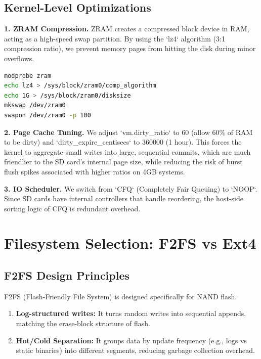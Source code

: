\documentclass[conference]{IEEEtran}
\begin{document}
\subsection{Kernel-Level Optimizations}

\textbf{1. ZRAM Compression.} ZRAM creates a compressed block device in RAM, acting as a high-speed swap partition. By using the `lz4` algorithm (3:1 compression ratio), we prevent memory pages from hitting the disk during minor overflows.

\begin{lstlisting}[language=bash, caption={ZRAM Activation Script}, label={lst:zram}]
modprobe zram
echo lz4 > /sys/block/zram0/comp_algorithm
echo 1G > /sys/block/zram0/disksize
mkswap /dev/zram0
swapon /dev/zram0 -p 100
\end{lstlisting}

\textbf{2. Page Cache Tuning.} We adjust `vm.dirty\_ratio` to 60 (allow 60\% of RAM to be dirty) and `dirty\_expire\_centisecs` to 360000 (1 hour). This forces the kernel to aggregate small writes into large, sequential commits, which are much friendlier to the SD card's internal page size, while reducing the risk of burst flush spikes associated with higher ratios on 4GB systems.

\textbf{3. IO Scheduler.} We switch from `CFQ` (Completely Fair Queuing) to `NOOP`. Since SD cards have internal controllers that handle reordering, the host-side sorting logic of CFQ is redundant overhead.

\section{Filesystem Selection: F2FS vs Ext4}

\subsection{F2FS Design Principles}
F2FS (Flash-Friendly File System) is designed specifically for NAND flash.
\begin{enumerate}
    \item \textbf{Log-structured writes:} It turns random writes into sequential appends, matching the erase-block structure of flash.
    \item \textbf{Hot/Cold Separation:} It groups data by update frequency (e.g., logs vs static binaries) into different segments, reducing garbage collection overhead.
\end{enumerate}
\end{document}
